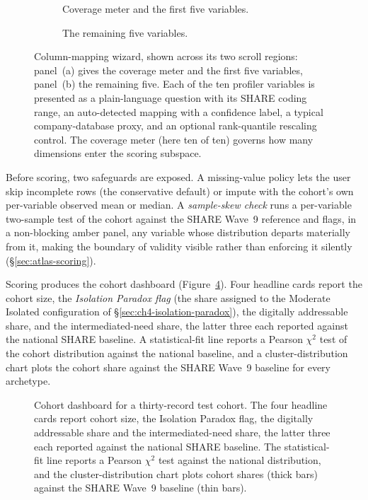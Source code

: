 \begin{figure}[H]
  \centering
  \begin{subfigure}[t]{0.50\linewidth}
    \centering
    \caption{Coverage meter and the first five variables.}
    \label{fig:atlas-wizard-a}
  \end{subfigure}\hfill
  \begin{subfigure}[t]{0.50\linewidth}
    \centering
    \caption{The remaining five variables.}
    \label{fig:atlas-wizard-b}
  \end{subfigure}
  \caption[Italian Silver Atlas, column-mapping wizard]{Column-mapping wizard, shown across its two scroll regions: panel~(a) gives the coverage meter and the first five variables, panel~(b) the remaining five. Each of the ten profiler variables is presented as a plain-language question with its SHARE coding range, an auto-detected mapping with a confidence label, a typical company-database proxy, and an optional rank-quantile rescaling control. The coverage meter (here ten of ten) governs how many dimensions enter the scoring subspace.}
  \label{fig:atlas-wizard}
\end{figure}

Before scoring, two safeguards are exposed. A missing-value policy lets the user skip incomplete rows (the conservative default) or impute with the cohort's own per-variable observed mean or median. A \emph{sample-skew check} runs a per-variable two-sample test of the cohort against the SHARE Wave~9 reference and flags, in a non-blocking amber panel, any variable whose distribution departs materially from it, making the boundary of validity visible rather than enforcing it silently (\S\ref{sec:atlas-scoring}).

Scoring produces the cohort dashboard (Figure~\ref{fig:atlas-dashboard}). Four headline cards report the cohort size, the \emph{Isolation Paradox flag} (the share assigned to the Moderate Isolated configuration of \S\ref{sec:ch4-isolation-paradox}), the digitally addressable share, and the intermediated-need share, the latter three each reported against the national SHARE baseline. A statistical-fit line reports a Pearson $\chi^2$ test of the cohort distribution against the national baseline, and a cluster-distribution chart plots the cohort share against the SHARE Wave~9 baseline for every archetype.

\begin{figure}[H]
  \centering
  \caption[Italian Silver Atlas, cohort dashboard]{Cohort dashboard for a thirty-record test cohort. The four headline cards report cohort size, the Isolation Paradox flag, the digitally addressable share and the intermediated-need share, the latter three each reported against the national SHARE baseline. The statistical-fit line reports a Pearson $\chi^2$ test against the national distribution, and the cluster-distribution chart plots cohort shares (thick bars) against the SHARE Wave~9 baseline (thin bars).}
  \label{fig:atlas-dashboard}
\end{figure}


